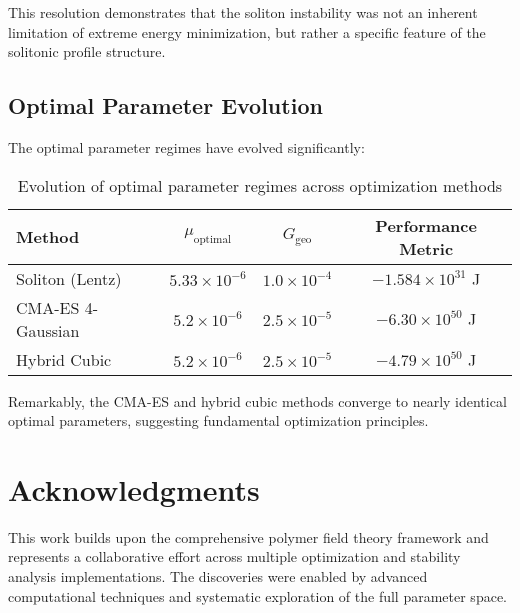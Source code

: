 \documentclass[12pt,a4paper]{article}
\begin{document}
This resolution demonstrates that the soliton instability was not an inherent limitation of extreme energy minimization, but rather a specific feature of the solitonic profile structure.

\subsection{Optimal Parameter Evolution}

The optimal parameter regimes have evolved significantly:

\begin{table}[h]
\centering
\begin{tabular}{lccc}
\toprule
Method & $\mu_{\text{optimal}}$ & $G_{\text{geo}}$ & Performance Metric \\
\midrule
Soliton (Lentz) & $5.33 \times 10^{-6}$ & $1.0 \times 10^{-4}$ & $-1.584 \times 10^{31}$ J \\
CMA-ES 4-Gaussian & $5.2 \times 10^{-6}$ & $2.5 \times 10^{-5}$ & $-6.30 \times 10^{50}$ J \\
Hybrid Cubic & $5.2 \times 10^{-6}$ & $2.5 \times 10^{-5}$ & $-4.79 \times 10^{50}$ J \\
\bottomrule
\end{tabular}
\caption{Evolution of optimal parameter regimes across optimization methods}
\end{table}

Remarkably, the CMA-ES and hybrid cubic methods converge to nearly identical optimal parameters, suggesting fundamental optimization principles.

\section*{Acknowledgments}

This work builds upon the comprehensive polymer field theory framework and represents a collaborative effort across multiple optimization and stability analysis implementations. The discoveries were enabled by advanced computational techniques and systematic exploration of the full parameter space.
\end{document}

